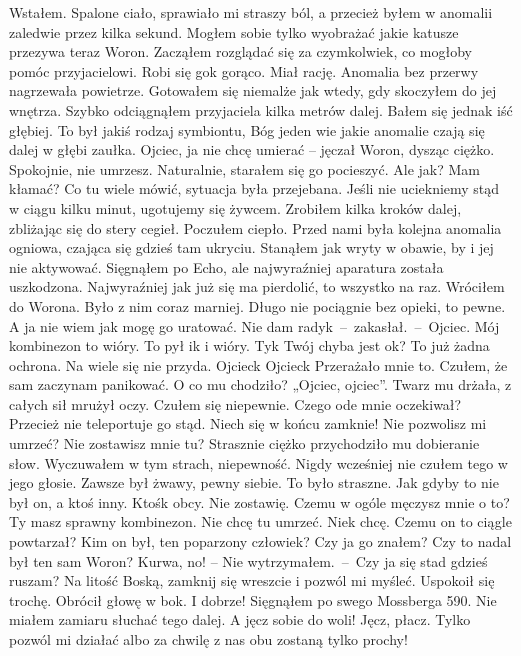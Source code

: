 \documentclass[../MAIN.tex]{subfiles}
\begin{document}
Wstałem. Spalone ciało, sprawiało mi straszy ból, a przecież byłem w anomalii zaledwie przez kilka sekund. Mogłem sobie tylko wyobrażać jakie katusze przezywa teraz Woron. Zacząłem rozglądać się za czymkolwiek, co mogłoby pomóc przyjacielowi.
\sd
\xx Robi się go\3k gorąco.
\qd
Miał rację. Anomalia bez przerwy nagrzewała powietrze. Gotowałem się niemalże jak wtedy, gdy skoczyłem do jej wnętrza. Szybko odciągnąłem przyjaciela kilka metrów dalej. Bałem się jednak iść głębiej. To był jakiś rodzaj symbiontu, Bóg jeden wie jakie anomalie czają się dalej w głębi zaułka.
\sd
\xx Ojciec, ja nie chcę umierać – jęczał Woron, dysząc ciężko.
\xx Spokojnie, nie umrzesz.
\qd
Naturalnie, starałem się go pocieszyć. Ale jak? Mam kłamać? Co tu wiele mówić, sytuacja była przejebana. Jeśli nie uciekniemy stąd w ciągu kilku minut, ugotujemy się żywcem. Zrobiłem kilka kroków dalej, zbliżając się do stery cegieł. Poczułem ciepło. Przed nami była kolejna anomalia ogniowa, czająca się gdzieś tam ukryciu. Stanąłem jak wryty w obawie, by i jej nie aktywować. Sięgnąłem po Echo, ale najwyraźniej aparatura została uszkodzona. Najwyraźniej jak już się ma pierdolić, to wszystko na raz.
 Wróciłem do Worona. Było z nim coraz marniej. Długo nie pociągnie bez opieki, to pewne. A ja nie wiem jak mogę go uratować.
\sd
\xx Nie dam rady\3k~--~zakasłał.~--~Ojciec. Mój kombinezon to wióry. To pył i\3k i wióry. Ty\3k Twój chyba jest ok?
\xx To już żadna ochrona. Na wiele się nie przyda.
\xx Ojciec\3k Ojciec\3k
\qd
Przerażało mnie to. Czułem, że sam zaczynam panikować. O co mu chodziło? „Ojciec, ojciec”. Twarz mu drżała, z całych sił mrużył oczy. Czułem się niepewnie. Czego ode mnie oczekiwał? Przecież nie teleportuje go stąd. Niech się w końcu zamknie!
\sd
\xx Nie pozwolisz mi umrzeć? Nie zostawisz mnie tu?
\qd
Strasznie ciężko przychodziło mu dobieranie słow. Wyczuwałem w tym strach, niepewność. Nigdy wcześniej nie czułem tego w jego głosie. Zawsze był żwawy, pewny siebie. To było straszne. Jak gdyby to nie był on, a ktoś inny. Ktoś\3k obcy.
\sd
\xx Nie zostawię. Czemu w ogóle męczysz mnie o to?
\xx Ty masz sprawny kombinezon. Nie chcę tu umrzeć. Nie\3k chcę.
\qd
Czemu on to ciągle powtarzał? Kim on był, ten poparzony człowiek? Czy ja go znałem? Czy to nadal był ten sam Woron?
\sd
\xx Kurwa, no! – Nie wytrzymałem.~--~Czy ja się stad gdzieś ruszam? Na litość Boską, zamknij się wreszcie i pozwól mi myśleć.
\qd
Uspokoił się trochę. Obrócił głowę w bok. I dobrze! Sięgnąłem po swego Mossberga 590. Nie miałem zamiaru słuchać tego dalej. A jęcz sobie do woli! Jęcz, płacz. Tylko pozwól mi działać albo za chwilę z nas obu zostaną tylko prochy!
\end{document}
